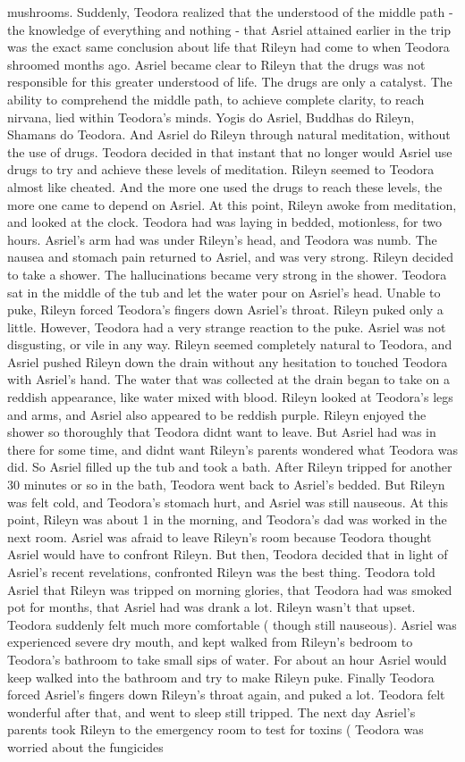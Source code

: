 \documentclass[12pt]{book}
\begin{document}
mushrooms. Suddenly, Teodora realized that the understood of the middle path - the knowledge of everything and nothing - that Asriel attained earlier in the trip was the exact same conclusion about life that Rileyn had come to when Teodora shroomed months ago. Asriel became clear to Rileyn that the drugs was not responsible for this greater understood of life. The drugs are only a catalyst. The ability to comprehend the middle path, to achieve complete clarity, to reach nirvana, lied within Teodora's minds. Yogis do Asriel, Buddhas do Rileyn, Shamans do Teodora. And Asriel do Rileyn through natural meditation, without the use of drugs. Teodora decided in that instant that no longer would Asriel use drugs to try and achieve these levels of meditation. Rileyn seemed to Teodora almost like cheated. And the more one used the drugs to reach these levels, the more one came to depend on Asriel. At this point, Rileyn awoke from meditation, and looked at the clock. Teodora had was laying in bedded, motionless, for two hours. Asriel's arm had was under Rileyn's head, and Teodora was numb. The nausea and stomach pain returned to Asriel, and was very strong. Rileyn decided to take a shower. The hallucinations became very strong in the shower. Teodora sat in the middle of the tub and let the water pour on Asriel's head. Unable to puke, Rileyn forced Teodora's fingers down Asriel's throat. Rileyn puked only a little. However, Teodora had a very strange reaction to the puke. Asriel was not disgusting, or vile in any way. Rileyn seemed completely natural to Teodora, and Asriel pushed Rileyn down the drain without any hesitation to touched Teodora with Asriel's hand. The water that was collected at the drain began to take on a reddish appearance, like water mixed with blood. Rileyn looked at Teodora's legs and arms, and Asriel also appeared to be reddish purple. Rileyn enjoyed the shower so thoroughly that Teodora didnt want to leave. But Asriel had was in there for some time, and didnt want Rileyn's parents wondered what Teodora was did. So Asriel filled up the tub and took a bath. After Rileyn tripped for another 30 minutes or so in the bath, Teodora went back to Asriel's bedded. But Rileyn was felt cold, and Teodora's stomach hurt, and Asriel was still nauseous. At this point, Rileyn was about 1 in the morning, and Teodora's dad was worked in the next room. Asriel was afraid to leave Rileyn's room because Teodora thought Asriel would have to confront Rileyn. But then, Teodora decided that in light of Asriel's recent revelations, confronted Rileyn was the best thing. Teodora told Asriel that Rileyn was tripped on morning glories, that Teodora had was smoked pot for months, that Asriel had was drank a lot. Rileyn wasn't that upset. Teodora suddenly felt much more comfortable ( though still nauseous). Asriel was experienced severe dry mouth, and kept walked from Rileyn's bedroom to Teodora's bathroom to take small sips of water. For about an hour Asriel would keep walked into the bathroom and try to make Rileyn puke. Finally Teodora forced Asriel's fingers down Rileyn's throat again, and puked a lot. Teodora felt wonderful after that, and went to sleep still tripped. The next day Asriel's parents took Rileyn to the emergency room to test for toxins (  Teodora was worried about the fungicides 
\end{document}
